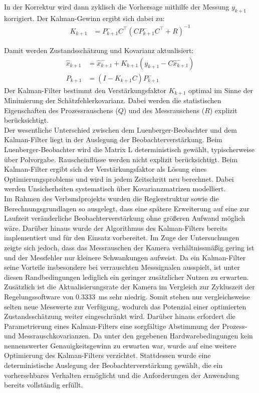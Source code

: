 In der Korrektur wird dann zyklisch die Vorhersage mithilfe der Messung $y_{k+1}$ korrigiert. Der Kalman-Gewinn ergibt sich dabei zu:
\begin{align}
K_{k+1} &= P_{k+1}^- C^\top \left( C P_{k+1}^- C^\top + R \right)^{-1}
\end{align}

Damit werden Zustandsschätzung und Kovarianz aktualisiert:
\begin{align}
\hat{x}_{k+1} &= \hat{x}_{k+1}^- + K_{k+1} \left( y_{k+1} - C \hat{x}_{k+1}^- \right) \\
P_{k+1} &= \left( I - K_{k+1} C \right) P_{k+1}^-
\end{align}
Der Kalman-Filter bestimmt den Verstärkungsfaktor $K_{k+1}$ optimal im Sinne der Minimierung der Schätzfehlerkovarianz. Dabei werden die statistischen Eigenschaften des Prozessrauschens ($Q$) und des Messrauschens ($R$) explizit berücksichtigt.\\
Der wesentliche Unterschied zwischen dem Luenberger-Beobachter und dem Kalman-Filter liegt in der Auslegung der Beobachterverstärkung. Beim Luenberger-Beobachter wird die Matrix L deterministisch gewählt, typischerweise über Polvorgabe. Rauscheinflüsse werden nicht explizit berücksichtigt. Beim Kalman-Filter ergibt sich der Verstärkungsfaktor als Lösung eines Optimierungsproblems und wird in jedem Zeitschritt neu berechnet. Dabei werden Unsicherheiten systematisch über Kovarianzmatrizen modelliert.\\
Im Rahmen des Verbundprojekts wurden die Reglerstruktur sowie die Berechnungsgrundlagen so ausgelegt, dass eine spätere Erweiterung auf eine zur Laufzeit veränderliche Beobachterverstärkung ohne größeren Aufwand möglich wäre. Darüber hinaus wurde der Algorithmus des Kalman-Filters bereits implementiert und für den Einsatz vorbereitet. Im Zuge der Untersuchungen zeigte sich jedoch, dass das Messrauschen der Kamera verhältnissmäßig gering ist und der Messfehler nur kleinere Schwankungen aufweist. Da ein Kalman-Filter seine Vorteile insbesondere bei verrauschten Messsignalen ausspielt, ist unter diesen Randbedingungen lediglich ein geringer zusätzlicher Nutzen zu erwarten. Zusätzlich ist die Aktualisierungsrate der Kamera im Vergleich zur Zykluszeit der Regelungssoftware von \SI{0.3333}{\milli\second} sehr niedrig. Somit stehen nur vergleichsweise selten neue Messwerte zur Verfügung, wodurch das Potenzial einer optimierten Zustandsschätzung weiter eingeschränkt wird. Darüber hinaus erfordert die Parametrierung eines Kalman-Filters eine sorgfältige Abstimmung der Prozess- und Messrauschkovarianzen. Da unter den gegebenen Hardwarebedingungen kein nennenswerter Genauigkeitsgewinn zu erwarten war, wurde auf eine weitere Optimierung des Kalman-Filters verzichtet. Stattdessen wurde eine deterministische Auslegung der Beobachterverstärkung gewählt, die ein vorhersehbares Verhalten ermöglicht und die Anforderungen der Anwendung bereits vollständig erfüllt.
